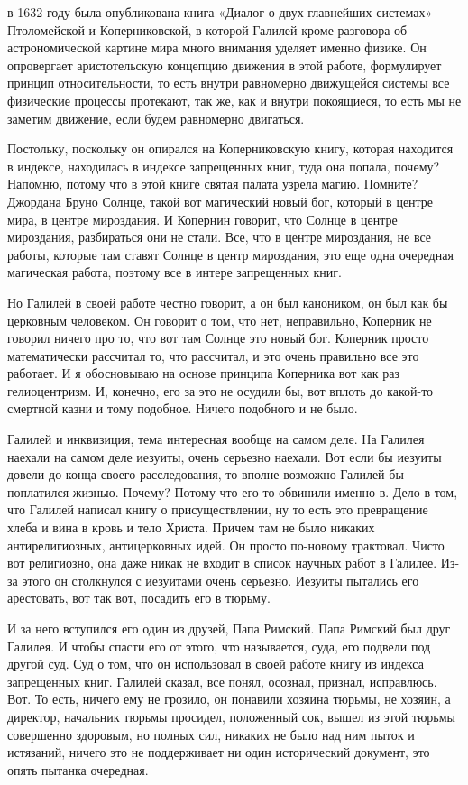 в 1632 году была опубликована книга «Диалог о двух главнейших
системах» Птоломейской и Коперниковской, в которой Галилей кроме разговора об
астрономической картине мира много внимания уделяет именно физике. Он
опровергает аристотельскую концепцию движения в этой работе, формулирует принцип
относительности, то есть внутри равномерно движущейся системы все физические
процессы протекают, так же, как и внутри покоящиеся, то есть мы не заметим
движение, если будем равномерно двигаться. 

Постольку, поскольку он опирался на
Коперниковскую книгу, которая находится в индексе, находилась в индексе
запрещенных книг, туда она попала, почему? Напомню, потому что в этой книге
святая палата узрела магию. Помните? Джордана Бруно Солнце, такой вот магический
новый бог, который в центре мира, в центре мироздания. И Копернин говорит, что
Солнце в центре мироздания, разбираться они не стали. Все, что в центре
мироздания, не все работы, которые там ставят Солнце в центр мироздания, это еще
одна очередная магическая работа, поэтому все в интере запрещенных книг. 

Но
Галилей в своей работе честно говорит, а он был каноником, он был как бы
церковным человеком. Он говорит о том, что нет, неправильно, Коперник не говорил
ничего про то, что вот там Солнце это новый бог. Коперник просто математически
рассчитал то, что рассчитал, и это очень правильно все это работает. И я
обосновываю на основе принципа Коперника вот как раз гелиоцентризм. И, конечно,
его за это не осудили бы, вот вплоть до какой-то смертной казни и тому подобное.
Ничего подобного и не было. 

Галилей и инквизиция, тема
интересная вообще на самом деле. На Галилея наехали на самом деле иезуиты, очень
серьезно наехали. Вот если бы иезуиты довели до конца своего расследования, то
вполне возможно Галилей бы поплатился жизнью. Почему? Потому что его-то обвинили
именно в.
Дело в том, что Галилей написал книгу о присуществлении, ну то есть это
превращение хлеба и вина в кровь и тело Христа. Причем там не было никаких
антирелигиозных, антицерковных идей. Он просто по-новому трактовал. Чисто вот
религиозно, она даже никак не входит в список научных работ в Галилее. Из-за
этого он столкнулся с иезуитами очень серьезно. Иезуиты пытались его арестовать,
вот так вот, посадить его в тюрьму. 

И за него вступился его один из друзей, Папа
Римский. Папа Римский был друг Галилея. И чтобы спасти его от этого, что
называется, суда, его подвели под другой суд. Суд о том, что он использовал в
своей работе книгу из индекса запрещенных книг. Галилей сказал, все понял,
осознал, признал, исправлюсь. Вот. То есть, ничего ему не грозило, он понавили
хозяина тюрьмы, не хозяин, а директор, начальник тюрьмы просидел, положенный
сок, вышел из этой тюрьмы совершенно здоровым, но полных сил, никаких не было
над ним пыток и истязаний, ничего это не поддерживает ни один исторический
документ, это опять пытанка очередная. 

